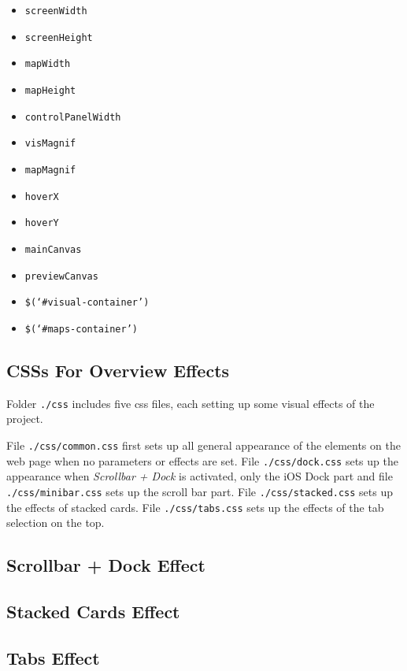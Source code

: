 \begin{itemize}
  \item \texttt{screenWidth}
  \item \texttt{screenHeight}
  \item \texttt{mapWidth}
  \item \texttt{mapHeight}
  \item \texttt{controlPanelWidth}
  \item \texttt{visMagnif}
  \item \texttt{mapMagnif}
  \item \texttt{hoverX}
  \item \texttt{hoverY}
  \item \texttt{mainCanvas}
  \item \texttt{previewCanvas}
  \item \texttt{\$(`\#visual-container')}
  \item \texttt{\$(`\#maps-container')}
\end{itemize}

\subsection{CSSs For Overview Effects}
\label{chap4:frontend-css}

Folder \texttt{./css} includes five \gls{css} files, each setting up some visual effects of the project.

File \texttt{./css/common.css} first sets up all general appearance of the elements on the web page when no parameters or effects are set. File \texttt{./css/dock.css} sets up the appearance when \emph{Scrollbar + Dock} is activated, only the iOS Dock part and file \\\texttt{./css/minibar.css} sets up the scroll bar part. File \texttt{./css/stacked.css} sets up the effects of stacked cards. File \texttt{./css/tabs.css} sets up the effects of the tab selection on the top.

\subsection{Scrollbar + Dock Effect}

\subsection{Stacked Cards Effect}

\subsection{Tabs Effect}

